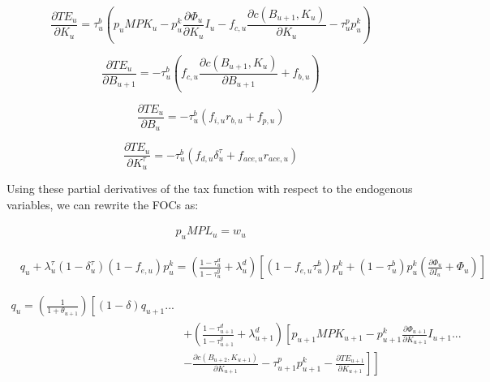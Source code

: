 \begin{equation}
\label{eqn:d_te_k}
\frac{\partial TE_{u}}{\partial K_{u}}= \tau^{b}_{u}\left( p_{u}MPK_{u} - p^{k}_{u}\frac{\partial \Phi_{u}}{\partial K_{u}}I_{u} - f_{c,u}\frac{\partial c(B_{u+1},K_{u})}{\partial K_{u}}- \tau^{p}_{u}p^{k}_{u}\right)
\end{equation}

\begin{equation}
\label{eqn:d_te_bp1}
\frac{\partial TE_{u}}{\partial B_{u+1}}= -\tau^{b}_{u}\left( f_{c,u}\frac{\partial c(B_{u+1},K_{u})}{\partial B_{u+1}} + f_{b,u}\right)
\end{equation}

\begin{equation}
\label{eqn:d_te_b}
\frac{\partial TE_{u}}{\partial B_{u}}= -\tau^{b}_{u}\left(f_{i,u}r_{b,u} + f_{p,u} \right)
\end{equation}

\begin{equation}
\label{eqn:d_te_b}
\frac{\partial TE_{u}}{\partial K^{\tau}_{u}}= -\tau^{b}_{u}\left(f_{d,u}\delta^{\tau}_{u}+f_{ace,u}r_{ace,u} \right)
\end{equation}


Using these partial derivatives of the tax function with respect to the endogenous variables, we can rewrite the FOCs as:


\begin{equation}
\label{eqn:foc_l_tax}
\begin{split}
 p_{u}MPL_{u} = w_{u} 
 \end{split}
\end{equation}

 \begin{equation}
\label{eqn:foc_i_tax}
\begin{split}
 & q_{u} + \lambda^{\tau}_{u}(1-\delta^{\tau}_{u})(1-f_{e,u})p^{k}_{u} =  \left(\frac{1-\tau^{d}_{u}}{1-\tau^{g}_{u}} + \lambda^{d}_{u}\right)\left[(1-f_{e,u}\tau^{b}_{u})p^{k}_{u}+ (1-\tau^{b}_{u})p^{k}_{u}\left(\frac{\partial \Phi_{u}}{\partial I_{u}} + \Phi_{u}\right)\right]
\end{split}
\end{equation}


 \begin{equation}
\label{eqn:foc_k_tax}
\begin{split}
 q_{u} = \left(\frac{1}{1+\theta_{u+1}}\right)\left[(1-\delta)q_{u+1} ... \right. \\
& \left. +  \left(\frac{1-\tau^{d}_{u+1}}{1-\tau^{g}_{u+1}} + \lambda^{d}_{u+1} \right)\left[p_{u+1}MPK_{u+1}- p^{k}_{u+1}\frac{\partial \Phi_{u+1}}{\partial K_{u+1}}I_{u+1}  ... \right.\right. \\
& \left.\left.- \frac{\partial c(B_{u+2},K_{u+1})}{\partial K_{u+1}}-\tau^{p}_{u+1}p^{k}_{u+1}-\frac{\partial TE_{u+1}}{\partial K_{u+1}} \right] \right]
\end{split}
\end{equation}

